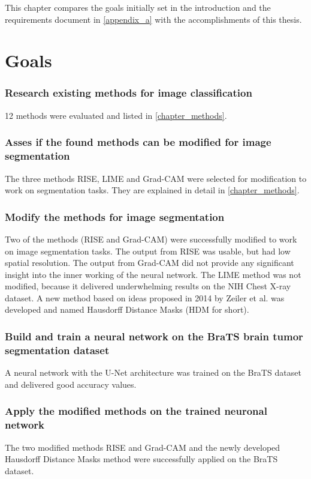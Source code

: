 This chapter compares the goals initially set in the introduction and the requirements document in \autoref{appendix_a}  with the accomplishments of this thesis.

\section{Goals}

\subsubsection{Research existing methods for image classification}
12 methods were evaluated and listed in \autoref{chapter_methods}.

\subsubsection{Asses if the found methods can be modified for image segmentation}
The three methods RISE, LIME and Grad-CAM were selected for modification to work on segmentation tasks. They are explained in detail in \autoref{chapter_methods}.

\subsubsection{Modify the methods for image segmentation}
Two of the methods (RISE and Grad-CAM) were successfully modified to work on image segmentation tasks. The output from RISE was usable, but had low spatial resolution. The output from Grad-CAM did not provide any significant insight into the inner working of the neural network.  The LIME method was not modified, because it delivered underwhelming results on the NIH Chest X-ray dataset. A new method based on ideas proposed in 2014 by Zeiler et al.\cite{zeiler2014visualizing} was developed and named Hausdorff Distance Masks (HDM for short).

\subsubsection{Build and train a neural network on the BraTS brain tumor segmentation dataset}
A neural network with the U-Net architecture was trained on the BraTS dataset and delivered good accuracy values.

\subsubsection{Apply the modified methods on the trained neuronal network}
The two modified methods RISE and Grad-CAM and the newly developed Hausdorff Distance Masks method were successfully applied on the BraTS dataset.

